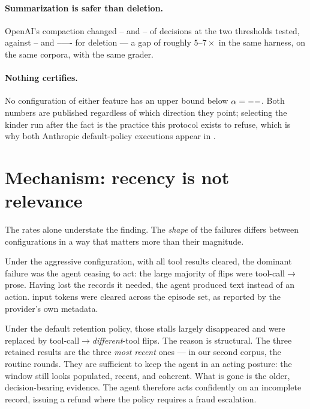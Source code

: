 \documentclass[11pt]{article}
\newcommand{\pcAnthropicDefaultTwoAB}{--}\newcommand{\pcAnthropicDefaultTwoAA}{--}%
\newcommand{\pcAnthropicDefaultOneAB}{--}\newcommand{\pcAnthropicDefaultOneAA}{--}%
\newcommand{\pcAnthropicAggressiveAB}{--}\newcommand{\pcAnthropicAggressiveAA}{--}%
\newcommand{\pcOpenAIThreeKAB}{--}\newcommand{\pcOpenAIThreeKAA}{--}%
\newcommand{\pcOpenAIOneKAB}{--}\newcommand{\pcOpenAIOneKAA}{--}%
\begin{document}
\paragraph{Summarization is safer than deletion.}
OpenAI's compaction changed \pcOpenAIOneKAB{} and \pcOpenAIThreeKAB{} of decisions
at the two thresholds tested, against \pcAnthropicAggressiveAB{} and
\pcAnthropicDefaultOneAB{}--\pcAnthropicDefaultTwoAB{} for deletion --- a gap of
roughly $5$--$7\times$ in the same harness, on the same corpora, with the same
grader.

\paragraph{Nothing certifies.}
No configuration of either feature has an upper bound below $\alpha=--$.
Both numbers are published regardless of which direction they point; selecting the
kinder run after the fact is the practice this protocol exists to refuse, which is
why both Anthropic default-policy executions appear in .

\section{Mechanism: recency is not relevance}
\label{sec:mechanism}

The rates alone understate the finding. The \emph{shape} of the failures differs
between configurations in a way that matters more than their magnitude.

Under the aggressive configuration, with all tool results cleared, the dominant
failure was the agent ceasing to act: the large majority of flips were
tool-call$\rightarrow$prose. Having lost the records it needed, the agent produced
text instead of an action. \pcAnthropicAggressiveCleared{} input tokens were cleared across the
episode set, as reported by the provider's own metadata.

Under the default retention policy, those stalls largely disappeared and were
replaced by tool-call$\rightarrow$\emph{different}-tool flips. The reason is
structural. The three retained results are the three \emph{most recent} ones ---
in our second corpus, the routine rounds. They are sufficient to keep the agent in
an acting posture: the window still looks populated, recent, and coherent. What is
gone is the older, decision-bearing evidence. The agent therefore acts confidently
on an incomplete record, issuing a refund where the policy requires a fraud
escalation.
\end{document}
